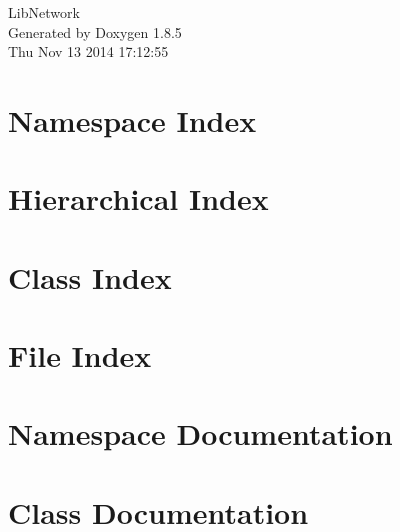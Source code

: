 \documentclass[twoside]{book}
\newcommand{\clearemptydoublepage}{%
  \newpage{\pagestyle{empty}\cleardoublepage}%
}
\begin{document}
\hypersetup{pageanchor=false}
\begin{titlepage}
\vspace*{7cm}
\begin{center}%
{\Large Lib\-Network }\\
\vspace*{1cm}
{\large Generated by Doxygen 1.8.5}\\
\vspace*{0.5cm}
{\small Thu Nov 13 2014 17:12:55}\\
\end{center}
\end{titlepage}
\clearemptydoublepage
\tableofcontents
\clearemptydoublepage
{}
\hypersetup{pageanchor=true}

\chapter{Namespace Index}

\chapter{Hierarchical Index}

\chapter{Class Index}

\chapter{File Index}

\chapter{Namespace Documentation}

\chapter{Class Documentation}




















\end{document}
